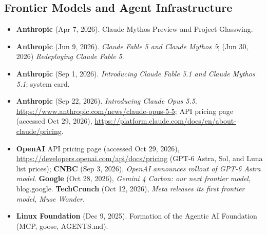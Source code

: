 \documentclass[11pt,letterpaper]{article}
\begin{document}
\subsection*{Frontier Models and Agent Infrastructure}
\begin{itemize}
  \item \textbf{Anthropic} (Apr 7, 2026). Claude Mythos Preview and Project Glasswing.
  \item \textbf{Anthropic} (Jun 9, 2026). \textit{Claude Fable 5 and Claude Mythos 5}; (Jun 30, 2026) \textit{Redeploying Claude Fable 5}.
  \item \textbf{Anthropic} (Sep 1, 2026). \textit{Introducing Claude Fable 5.1 and Claude Mythos 5.1}; system card.
  \item \textbf{Anthropic} (Sep 22, 2026). \textit{Introducing Claude Opus 5.5}. \url{https://www.anthropic.com/news/claude-opus-5-5}; API pricing page (accessed Oct 29, 2026), \url{https://platform.claude.com/docs/en/about-claude/pricing}.
  \item \textbf{OpenAI} API pricing page (accessed Oct 29, 2026), \url{https://developers.openai.com/api/docs/pricing} (GPT-6 Astra, Sol, and Luna list prices); \textbf{CNBC} (Sep 3, 2026), \textit{OpenAI announces rollout of GPT-6 Astra model}. \textbf{Google} (Oct 28, 2026), \textit{Gemini 4 Carbon: our next frontier model}, blog.google. \textbf{TechCrunch} (Oct 12, 2026), \textit{Meta releases its first frontier model, Muse Wonder}.
  \item \textbf{Linux Foundation} (Dec 9, 2025). Formation of the Agentic AI Foundation (MCP, goose, AGENTS.md).
\end{itemize}
\end{document}
